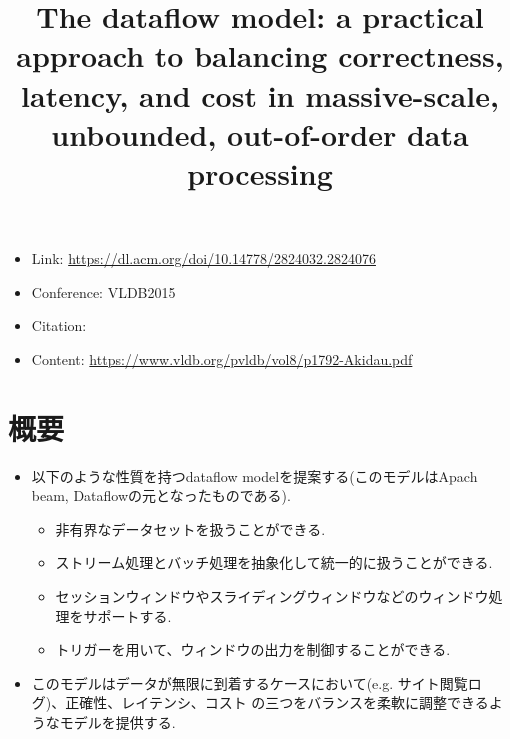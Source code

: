 \documentclass[dvipdfmx,uplatex]{jsarticle}
\title{The dataflow model: a practical approach to balancing correctness, latency, and cost in massive-scale, unbounded, out-of-order data processing}
\author{\empty}
\date{\empty}
\theoremstyle{remark}
\newenvironment{simplebox}{
    \begin{tcolorbox}[
        fonttitle=\bfseries,
    ]
}{
    \end{tcolorbox}
}
\begin{document}
\maketitle

\begin{itemize}
    \item Link: \url{https://dl.acm.org/doi/10.14778/2824032.2824076}
    \item Conference: VLDB2015
    \item Citation: \cite{dataflow-model}
    \item Content: \url{https://www.vldb.org/pvldb/vol8/p1792-Akidau.pdf}
\end{itemize}

\section{概要}
\begin{simplebox}
\begin{itemize}
    \item 以下のような性質を持つdataflow modelを提案する(このモデルはApach beam, Dataflowの元となったものである).
    \begin{itemize}
        \item 非有界なデータセットを扱うことができる.
        \item ストリーム処理とバッチ処理を抽象化して統一的に扱うことができる.
        \item セッションウィンドウやスライディングウィンドウなどのウィンドウ処理をサポートする.
        \item トリガーを用いて、ウィンドウの出力を制御することができる.
    \end{itemize}
    \item このモデルはデータが無限に到着するケースにおいて(e.g. サイト閲覧ログ)、正確性、レイテンシ、コスト
    の三つをバランスを柔軟に調整できるようなモデルを提供する.
\end{itemize}
\end{simplebox}
\end{document}
